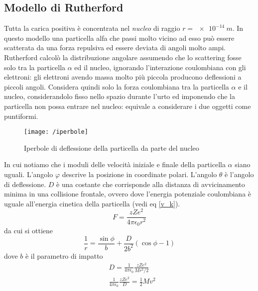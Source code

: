 \subsection{Modello di Rutherford}
Tutta la carica positiva è concentrata nel \textit{nucleo} di raggio $r = \SI{e-14}{m}$.
In questo modello una particella alfa che passi molto vicino ad esso può essere scatterata da una forza repulsiva ed essere deviata di angoli molto ampi.
Rutherford calcolò la distribuzione angolare assumendo che lo scattering fosse solo tra la particella $\alpha$ ed il nucleo, ignorando l'interazione coulombiana con gli elettroni: gli elettroni avendo massa molto più piccola producono deflessioni a piccoli angoli.
Considera quindi solo la forza coulombiana tra la particella $\alpha$ e il nucleo, considerandolo fisso nello spazio durante l'urto ed imponendo che la particella non possa entrare nel nucleo: equivale a considerare i due oggetti come puntiformi.
\begin{figure}[h]
\centering
\texttt{[image: /iperbole]}
\caption{Iperbole di deflessione della particella da parte del nucleo}
\end{figure}
In cui notiamo che i moduli delle velocità iniziale e finale della particella $\alpha$ siano uguali.
L'angolo $\varphi$ descrive la posizione in coordinate polari.
L'angolo $\theta$ è l'angolo di deflessione.
$D$ è una costante che corrisponde alla distanza di avvicinamento minima in una collisione frontale, ovvero dove l'energia potenziale coulombiana è uguale all'energia cinetica della particella (vedi eq \ref{v_k}).
\begin{equation}
F = \frac{z Z e^2}{4\pi \epsilon_0 r^2}
\end{equation}
da cui si ottiene
\begin{equation}
\frac{1}{r} = \frac{\sin \phi}{b} + \frac{D}{2 b^2} ( \cos \phi - 1 )
\end{equation}
dove $b$ è il parametro di impatto
\begin{equation}
\begin{split}
& D = \frac{1}{4\pi \epsilon_0} \frac{z Z e^2}{M r^2/2} \\
& \frac{1}{4\pi \epsilon_0} \frac{z Z e^2}{D} = \frac{ 1}{2 } M v^2
\end{split}
\label{v_k}
\end{equation}

